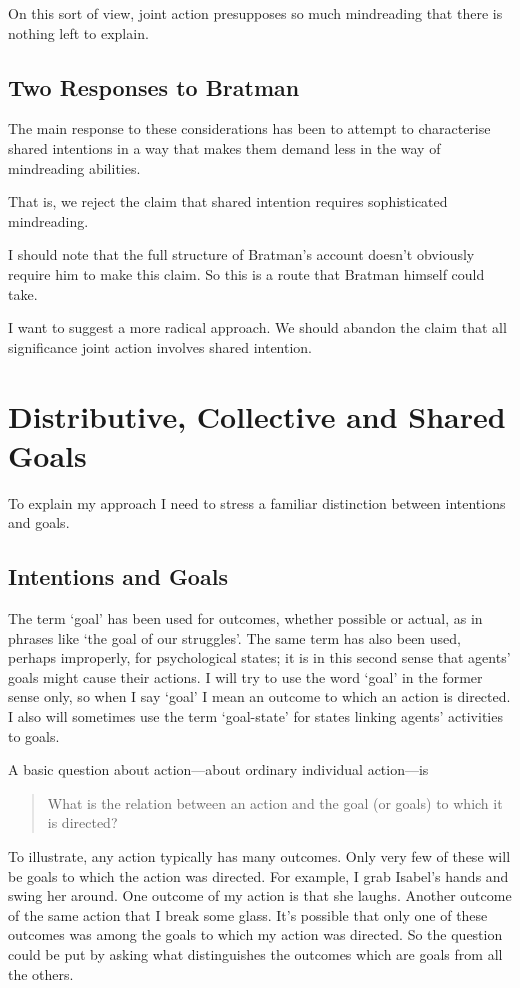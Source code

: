 \documentclass[12pt,a4paper]{extarticle}
\begin{document}
On this sort of view, joint action presupposes so much mindreading that there is nothing left to explain.


\subsection{Two Responses to Bratman}
The main response to these considerations has been to attempt to characterise shared intentions in a way that makes them demand less in the way of mindreading abilities.

That is, we reject the claim that shared intention requires sophisticated mindreading.

I should note that the full structure of Bratman's account doesn't obviously require him to make this claim.  So this is a route that Bratman himself could take.

I want to suggest a more radical approach.
We should abandon the claim that all significance joint action involves shared intention.





\section{Distributive, Collective and Shared Goals}

To explain my approach I need to stress a familiar distinction between intentions and goals.


\subsection{Intentions and Goals}
The term `goal' has been used for outcomes, whether possible or actual, as in phrases like `the goal of our struggles'.  The same term has also been used, perhaps improperly, for psychological states; it is in this second sense that agents' goals might cause their actions.  I will try to use the word `goal' in the former sense only, so when I say `goal' I mean an outcome to which an action is directed.   I also will sometimes use the term `goal-state' for states linking agents' activities to goals.

A basic question about action---about ordinary individual action---is
%
\begin{quote}
What is the relation between an action and the goal (or goals) to which it is directed?
\end{quote}
%
To illustrate, any action typically has many outcomes.
Only very few of these will be goals to which the action was directed.
For example, I grab Isabel's hands and swing her around.
One outcome of my action is that she laughs.
Another outcome of the same action that I break some glass.
It's possible that only one of these outcomes was among the goals to which my action was directed.
So the question could be put by asking what distinguishes the outcomes which are goals from all the others.
\end{document}

